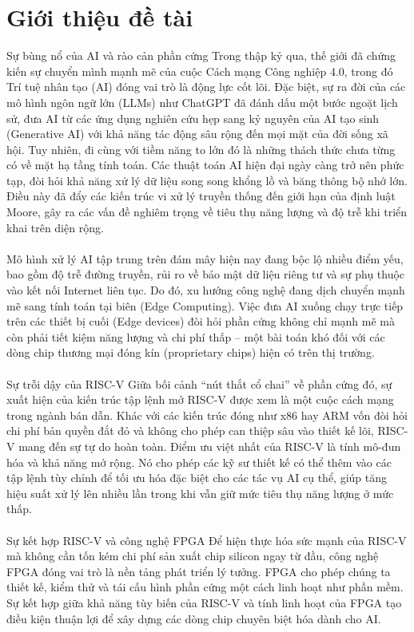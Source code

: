 \chapter{Giới thiệu đề tài}
\label{chp:01}

Sự bùng nổ của AI và rào cản phần cứng Trong thập kỷ qua, thế giới đã chứng kiến sự chuyển mình mạnh mẽ của cuộc Cách mạng Công nghiệp 4.0, trong đó Trí tuệ nhân tạo (AI) đóng vai trò là động lực cốt lõi. Đặc biệt, sự ra đời của các mô hình ngôn ngữ lớn (LLMs) như ChatGPT đã đánh dấu một bước ngoặt lịch sử, đưa AI từ các ứng dụng nghiên cứu hẹp sang kỷ nguyên của AI tạo sinh (Generative AI) với khả năng tác động sâu rộng đến mọi mặt của đời sống xã hội. Tuy nhiên, đi cùng với tiềm năng to lớn đó là những thách thức chưa từng có về mặt hạ tầng tính toán. Các thuật toán AI hiện đại ngày càng trở nên phức tạp, đòi hỏi khả năng xử lý dữ liệu song song khổng lồ và băng thông bộ nhớ lớn. Điều này đã đẩy các kiến trúc vi xử lý truyền thống đến giới hạn của định luật Moore, gây ra các vấn đề nghiêm trọng về tiêu thụ năng lượng và độ trễ khi triển khai trên diện rộng.\\
\\
Mô hình xử lý AI tập trung trên đám mây hiện nay đang bộc lộ nhiều điểm yếu, bao gồm độ trễ đường truyền, rủi ro về bảo mật dữ liệu riêng tư và sự phụ thuộc vào kết nối Internet liên tục. Do đó, xu hướng công nghệ đang dịch chuyển mạnh mẽ sang tính toán tại biên (Edge Computing). Việc đưa AI xuống chạy trực tiếp trên các thiết bị cuối (Edge devices) đòi hỏi phần cứng không chỉ mạnh mẽ mà còn phải tiết kiệm năng lượng và chi phí thấp – một bài toán khó đối với các dòng chip thương mại đóng kín (proprietary chips) hiện có trên thị trường.\\
\\
Sự trỗi dậy của RISC-V Giữa bối cảnh ``nút thắt cổ chai'' về phần cứng đó, sự xuất hiện của kiến trúc tập lệnh mở RISC-V được xem là một cuộc cách mạng trong ngành bán dẫn. Khác với các kiến trúc đóng như x86 hay ARM vốn đòi hỏi chi phí bản quyền đắt đỏ và không cho phép can thiệp sâu vào thiết kế lõi, RISC-V mang đến sự tự do hoàn toàn. Điểm ưu việt nhất của RISC-V là tính mô-đun hóa  và khả năng mở rộng. Nó cho phép các kỹ sư thiết kế có thể thêm vào các tập lệnh tùy chỉnh để tối ưu hóa đặc biệt cho các tác vụ AI cụ thể, giúp tăng hiệu suất xử lý lên nhiều lần trong khi vẫn giữ mức tiêu thụ năng lượng ở mức thấp.\\
\\
Sự kết hợp RISC-V và công nghệ FPGA Để hiện thực hóa sức mạnh của RISC-V mà không cần tốn kém chi phí sản xuất chip silicon ngay từ đầu, công nghệ FPGA đóng vai trò là nền tảng phát triển lý tưởng. FPGA cho phép chúng ta thiết kế, kiểm thử và tái cấu hình phần cứng một cách linh hoạt như phần mềm. Sự kết hợp giữa khả năng tùy biến của RISC-V và tính linh hoạt của FPGA tạo điều kiện thuận lợi để xây dựng các dòng chip chuyên biệt hóa dành cho AI.

